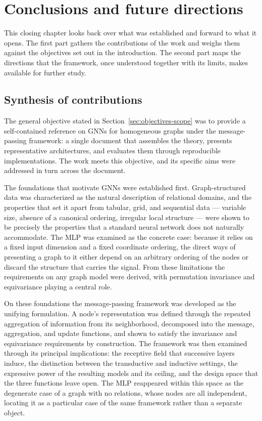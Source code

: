 \chapter{Conclusions and future directions}
\label{ch:conclusions}
\minitoc

This closing chapter looks back over what
was established and forward to what it opens. The first part gathers the
contributions of the work and weighs them against the objectives set out in
the introduction. The second part maps the directions that the framework,
once understood together with its limits, makes available for further study.

\section{Synthesis of contributions}
\label{sec:contributions}

The general objective stated in Section~\ref{sec:objectives-scope} was to
provide a self-contained reference on GNNs for homogeneous graphs under the
message-passing framework: a single document that assembles the theory, presents
representative architectures, and evaluates them through reproducible
implementations. The work meets this objective, and its specific aims were
addressed in turn across the document.

The foundations that motivate GNNs were established first. Graph-structured
data was characterized as the natural description of relational domains, and
the properties that set it apart from tabular, grid, and sequential data ---
variable size, absence of a canonical ordering, irregular local structure ---
were shown to be precisely the properties that a standard neural network does
not naturally accommodate. The MLP was examined as the concrete case: because
it relies on a fixed input dimension and a fixed coordinate ordering, the
direct ways of presenting a graph to it either depend on an arbitrary ordering
of the nodes or discard the structure that carries the signal. From these
limitations the requirements on any graph model were derived, with permutation
invariance and equivariance playing a central role.

On these foundations the message-passing framework was developed as the
unifying formulation. A node's representation was defined through the repeated
aggregation of information from its neighborhood, decomposed into the message,
aggregation, and update functions, and shown to satisfy the invariance and
equivariance requirements by construction. The framework was then examined through
its principal implications: the receptive field that successive layers induce, the distinction
between the transductive and inductive settings, the expressive power of the
resulting models and its ceiling, and the design space that the three functions
leave open. The MLP reappeared within this space as the degenerate case of a 
graph with no relations, whose nodes are all independent, locating it as a 
particular case of the same framework rather than a separate object.

